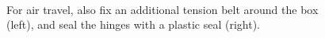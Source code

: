 \begin{figure}[!ht]
\centering
\mbox{\quad
{}}
\caption{For air travel, also fix an additional tension belt around the box (left), and seal the hinges with a plastic seal (right).} %
\end{figure}
